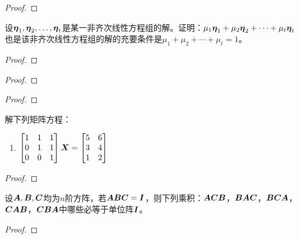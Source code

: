 \begin{problem}

\end{problem}
\begin{proof}

\end{proof}

\begin{problem}
设\({\boldsymbol{\eta}}_1,{\boldsymbol{\eta}}_2,\dots,{\boldsymbol{\eta}}_{t}\)是某一非齐次线性方程组的解。证明：\(\mu_1\boldsymbol{\eta}_1+\mu_2\boldsymbol{\eta}_2+\cdots+\mu_t\boldsymbol{\eta}_t\)也是该非齐次线性方程组的解的充要条件是\(\mu_1+\mu_2+\cdots+\mu_t=1\)。
\end{problem}
\begin{proof}

\end{proof}

\begin{problem}

\end{problem}
\begin{proof}

\end{proof}

\begin{problem}

\end{problem}
\begin{proof}

\end{proof}

\begin{problem}
解下列矩阵方程：
\begin{enumerate}
    \item \(\begin{bmatrix}1&1&1\\0&1&1\\0&0&1\end{bmatrix}\boldsymbol{X}=\begin{bmatrix}5&6\\3&4\\1&2\end{bmatrix}\)
\end{enumerate}
\end{problem}
\begin{proof}

\end{proof}

\begin{problem}
设\(\boldsymbol{A},\boldsymbol{B},\boldsymbol{C}\)均为\(n\)阶方阵，若\(\boldsymbol{A}\boldsymbol{B}\boldsymbol{C}=\boldsymbol{I}\)，则下列乘积：\(\boldsymbol{A}\boldsymbol{C}\boldsymbol{B}\)，\(\boldsymbol{B}\boldsymbol{A}\boldsymbol{C}\)，\(\boldsymbol{B}\boldsymbol{C}\boldsymbol{A}\)，\(\boldsymbol{C}\boldsymbol{A}\boldsymbol{B}\)，\(\boldsymbol{C}\boldsymbol{B}\boldsymbol{A}\)中哪些必等于单位阵\(\boldsymbol{I}\)。
\end{problem}
\begin{proof}

\end{proof}

